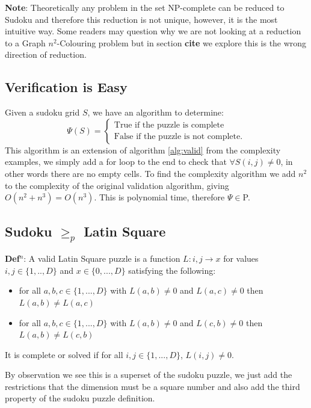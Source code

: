 \documentclass[a4paper,11pt]{report}
\newcounter{row}
\begin{document}
\textbf{Note}: Theoretically any problem in the set NP-complete can be reduced to Sudoku and therefore this reduction is not unique, however, it is the most intuitive way. Some readers may question why we are not looking at a reduction to a Graph
$n^2$-Colouring problem but in section \textbf{cite} we explore this is the wrong direction of reduction.

\subsection{Verification is Easy}

Given a sudoku grid $S$, we have an algorithm to determine:
		\begin{equation}
			\Psi(S) = \begin{cases}	
				\text{True if the puzzle is complete} \\
				\text{False if the puzzle is not complete}.
			\end{cases}
		\end{equation}
This algorithm is an extension of algorithm \ref{alg:valid} from the complexity examples, we simply add a for loop to the end to check that $\forall S(i,j) \neq 0 $, in other words there are no empty cells. To find the complexity algorithm we add $n^2$ to the complexity of the original validation algorithm, giving $O(n^2+n^3)=O(n^3)$. This is polynomial time, therefore $\Psi\in $P.
\subsection{Sudoku $\geq_p$ Latin Square}

\textbf{Def$^n$}: A valid Latin Square puzzle is a function $L:i,j \rightarrow x$ for values $i,j \in \{1,..,D\} $ and $x \in
\{0,...,D\}$ satisfying the following:
\begin{itemize}
\item{for all $a,b,c \in \{1,...,D\}$ with $L(a,b) \neq 0 $ and $L(a,c) \neq 0$ then $L(a,b) \neq L(a,c)$}
\item{for all $a,b,c \in \{1,...,D\}$ with $L(a,b) \neq 0 $ and $L(c,b) \neq 0$ then $L(a,b) \neq L(c,b)$}
\end{itemize}
It is complete or solved if for all $i,j \in \{1,...,D\}$, $L(i,j) \neq 0$.

By observation we see this is a superset of the sudoku puzzle, we just add the restrictions that the dimension must be a square number and also add the third property of the sudoku puzzle definition.
\end{document}
